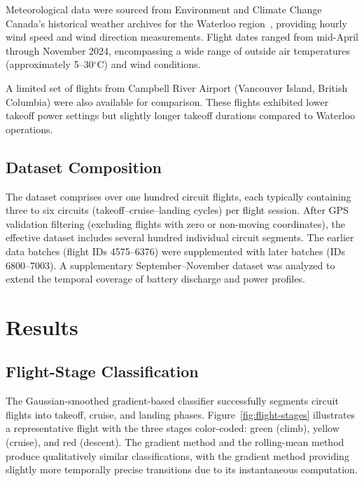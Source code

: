 \documentclass[11pt,a4paper]{article}
\begin{document}
Meteorological data were sourced from Environment and Climate Change Canada's historical weather archives for the Waterloo region~\cite{eccc}, providing hourly wind speed and wind direction measurements.
Flight dates ranged from mid-April through November 2024, encompassing a wide range of outside air temperatures (approximately 5--30$^\circ$C) and wind conditions.

A limited set of flights from Campbell River Airport (Vancouver Island, British Columbia) were also available for comparison.
These flights exhibited lower takeoff power settings but slightly longer takeoff durations compared to Waterloo operations.

\subsection{Dataset Composition}

The dataset comprises over one hundred circuit flights, each typically containing three to six circuits (takeoff--cruise--landing cycles) per flight session.
After GPS validation filtering (excluding flights with zero or non-moving coordinates), the effective dataset includes several hundred individual circuit segments.
The earlier data batches (flight IDs 4575--6376) were supplemented with later batches (IDs 6800--7003).
A supplementary September--November dataset was analyzed to extend the temporal coverage of battery discharge and power profiles.

\section{Results}

\subsection{Flight-Stage Classification}

The Gaussian-smoothed gradient-based classifier successfully segments circuit flights into takeoff, cruise, and landing phases.
Figure~\ref{fig:flight-stages} illustrates a representative flight with the three stages color-coded: green (climb), yellow (cruise), and red (descent).
The gradient method and the rolling-mean method produce qualitatively similar classifications, with the gradient method providing slightly more temporally precise transitions due to its instantaneous computation.
\end{document}
